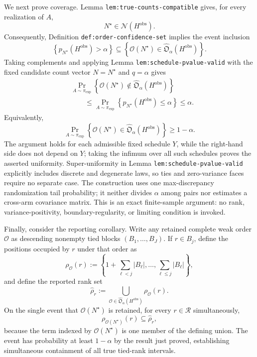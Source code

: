 We next prove coverage.  Lemma \texttt{lem:true-counts-compatible} gives, for every realization of \(A\),
\[
 N^\star\in\mathcal N(H^{\mathrm{obs}}).
\]
Consequently, Definition \texttt{def:order-confidence-set} implies the event inclusion
\[
 \left\{p_{N^\star}(H^{\mathrm{obs}})>\alpha\right\}
 \subseteq
 \left\{\mathcal O(N^\star)
 \in\widehat{\mathfrak O}_{\alpha}(H^{\mathrm{obs}})\right\}.
\]
Taking complements and applying Lemma \texttt{lem:schedule-pvalue-valid} with the fixed candidate count vector \(N=N^\star\) and \(q=\alpha\) gives
\[
\begin{aligned}
 &\Pr_{A\sim\pi_{\exp}}\!\left\{
   \mathcal O(N^\star)\notin
   \widehat{\mathfrak O}_{\alpha}(H^{\mathrm{obs}})
 \right\}\\
 &\qquad\leq
 \Pr_{A\sim\pi_{\exp}}\!\left\{
   p_{N^\star}(H^{\mathrm{obs}})\leq\alpha
 \right\}
 \leq\alpha.
\end{aligned}
\]
Equivalently,
\[
 \Pr_{A\sim\pi_{\exp}}\!\left\{
   \mathcal O(N^\star)\in
   \widehat{\mathfrak O}_{\alpha}(H^{\mathrm{obs}})
 \right\}\geq 1-\alpha.
\]
The argument holds for each admissible fixed schedule \(Y\), while the right-hand side does not depend on \(Y\); taking the infimum over all such schedules proves the asserted uniformity.  Super-uniformity in Lemma \texttt{lem:schedule-pvalue-valid} explicitly includes discrete and degenerate laws, so ties and zero-variance faces require no separate case.  The construction uses one max-discrepancy randomization tail probability; it neither divides \(\alpha\) among pairs nor estimates a cross-arm covariance matrix.  This is an exact finite-sample argument: no rank, variance-positivity, boundary-regularity, or limiting condition is invoked.

Finally, consider the reporting corollary.  Write any retained complete weak order \(\mathcal O\) as descending nonempty tied blocks \((B_1,\ldots,B_J)\).  If \(r\in B_j\), define the positions occupied by \(r\) under that order as
\[
 \rho_{\mathcal O}(r)
 :=\left\{
  1+\sum_{\ell<j}|B_\ell|,\ldots,
  \sum_{\ell\leq j}|B_\ell|
 \right\},
\]
and define the reported rank set
\[
 \widehat\rho_r
 :=\bigcup_{\mathcal O\in
   \widehat{\mathfrak O}_{\alpha}(H^{\mathrm{obs}})}
   \rho_{\mathcal O}(r).
\]
On the single event that \(\mathcal O(N^\star)\) is retained, for every \(r\in\mathcal R\) simultaneously,
\[
 \rho_{\mathcal O(N^\star)}(r)\subseteq\widehat\rho_r,
\]
because the term indexed by \(\mathcal O(N^\star)\) is one member of the defining union.  The event has probability at least \(1-\alpha\) by the result just proved, establishing simultaneous containment of all true tied-rank intervals.
